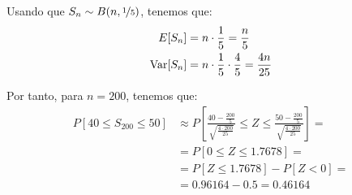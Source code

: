 \begin{ejercicio}
    Usando que $S_n\sim B(n, \nicefrac{1}{5})$, tenemos que:
    \begin{align*}
        E[S_n] &= n \cdot \frac{1}{5} = \frac{n}{5}\\
        \operatorname{Var}[S_n] &= n \cdot \frac{1}{5} \cdot \frac{4}{5} = \frac{4n}{25}
    \end{align*}

    Por tanto, para $n=200$, tenemos que:
    \begin{align*}
        P[40 \leq S_{200} \leq 50] &\approx P\left[\frac{40 - \frac{200}{5}}{\sqrt{\frac{4\cdot 200}{25}}} \leq Z \leq \frac{50 - \frac{200}{5}}{\sqrt{\frac{4\cdot 200}{25}}}\right]
        =\\&= P\left[0 \leq Z \leq 1.7678\right]
        =\\&= P\left[Z \leq 1.7678\right]-P\left[Z < 0\right]
        =\\&= 0.96164 - 0.5 = 0.46164
    \end{align*}
\end{ejercicio}

